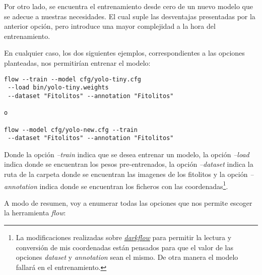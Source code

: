 Por otro lado, se encuentra el entrenamiento desde cero de un nuevo modelo que se adecue a nuestras necesidades. El cual suple las desventajas presentadas por la anterior opción, pero introduce una mayor complejidad a la hora del entrenamiento.

En cualquier caso, los dos siguientes ejemplos, correspondientes a las opciones planteadas, nos permitirían entrenar el modelo:

\begin{verbatim}
flow --train --model cfg/yolo-tiny.cfg
 --load bin/yolo-tiny.weights
 --dataset "Fitolitos" --annotation "Fitolitos"

o

flow --model cfg/yolo-new.cfg --train
 --dataset "Fitolitos" --annotation "Fitolitos"
\end{verbatim}

Donde la opción \textit{--train} indica que se desea entrenar un modelo, la opción \textit{--load} indica donde se encuentran los pesos pre-entrenados, la opción \textit{--dataset} indica la ruta de la carpeta donde se encuentran las imagenes de los fitolitos y la opción \textit{--annotation} indica donde se encuentran los ficheros con las coordenadas\footnote{La modificaciones realizadas sobre \href{https://github.com/thtrieu/darkflow}{\textit{darkflow}} para permitir la lectura y conversión de mis coordenadas están pensados para que el valor de las opciones \textit{dataset} y \textit{annotation} sean el mismo. De otra manera el modelo fallará en el entrenamiento.}.

A modo de resumen, voy a enumerar todas las opciones que nos permite escoger la herramienta \textit{flow}:

